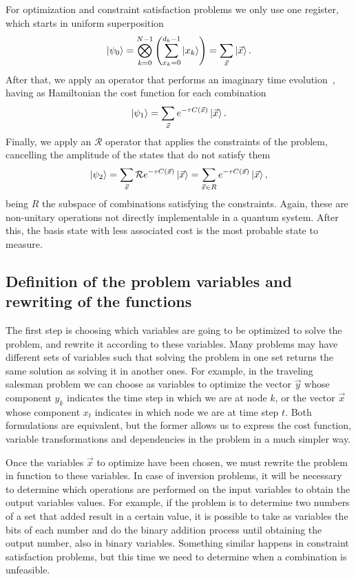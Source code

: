 For optimization and constraint satisfaction problems we only use one register, which starts in uniform superposition
\begin{equation}
    \ket{\psi_0} = \bigotimes_{k=0}^{N-1} \left(\sum_{x_k=0}^{d_k-1} \ket{x_k}\right)=\sum_{\vec{x}}\ket{\vec{x}}.
\end{equation}
After that, we apply an operator that performs an imaginary time evolution~\cite{ITE}, having as Hamiltonian the cost function for each combination
\begin{equation}
    \ket{\psi_1} = \sum_{\vec{x}}e^{-\tau C(\vec{x})}\ket{\vec{x}}.
\end{equation}
Finally, we apply an $\mathcal{R}$ operator that applies the constraints of the problem, cancelling the amplitude of the states that do not satisfy them
\begin{equation}
    \ket{\psi_2} = \sum_{\vec{x}}\mathcal{R}e^{-\tau C(\vec{x})}\ket{\vec{x}} = \sum_{\vec{x}\in R}e^{-\tau C(\vec{x})}\ket{\vec{x}},
\end{equation}
being $R$ the subspace of combinations satisfying the constraints. Again, these are non-unitary operations not directly implementable in a quantum system. After this, the basis state with less associated cost is the most probable state to measure.


\subsection{Definition of the problem variables and rewriting of the functions}

The first step is choosing which variables are going to be optimized to solve the problem, and rewrite it according to these variables. Many problems may have different sets of variables such that solving the problem in one set returns the same solution as solving it in another ones. For example, in the traveling salesman problem we can choose as variables to optimize the vector $\vec{y}$ whose component $y_k$ indicates the time step in which we are at node $k$, or the vector $\vec{x}$ whose component $x_t$ indicates in which node we are at time step $t$. Both formulations are equivalent, but the former allows us to express the cost function, variable transformations and dependencies in the problem in a much simpler way.

Once the variables $\vec{x}$ to optimize have been chosen, we must rewrite the problem in function to these variables. In case of inversion problems, it will be necessary to determine which operations are performed on the input variables to obtain the output variables values. For example, if the problem is to determine two numbers of a set that added result in a certain value, it is possible to take as variables the bits of each number and do the binary addition process until obtaining the output number, also in binary variables. Something similar happens in constraint satisfaction problems, but this time we need to determine when a combination is unfeasible.

